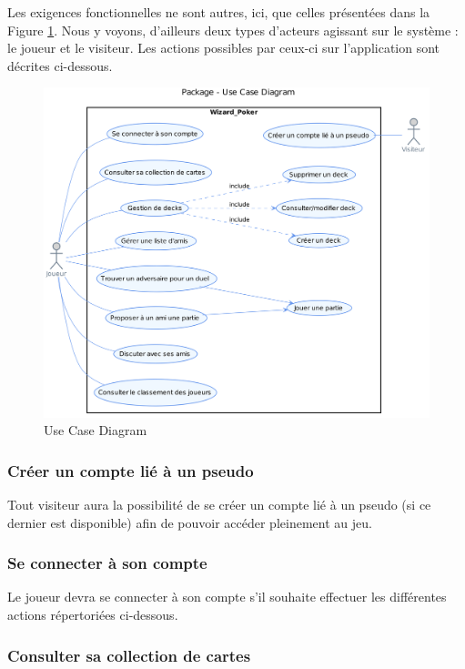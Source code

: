\documentclass[11pt,a4paper]{article}
\begin{document}
Les exigences fonctionnelles ne sont autres, ici, que celles présentées dans la Figure \ref{fig:usecasebesoin}. Nous y voyons, d'ailleurs deux types d'acteurs agissant sur le système : le joueur et le \gls{visiteur}. Les actions possibles par ceux-ci sur l'application sont décrites ci-dessous.

\label{sec:exi-fonc}
\begin{figure}[ht]
  \centering
  \includegraphics[width=1\textwidth]{../uml_files/UseCaseDiagram.png}
  \caption{\label{fig:usecasebesoin} Use Case Diagram}
\end{figure}

\subsubsection*{Créer un compte lié à un pseudo}

Tout visiteur aura la possibilité de se créer un compte
lié à un \gls{pseudo} (si ce dernier est disponible) afin de pouvoir
accéder pleinement au jeu.


\subsubsection*{Se connecter à son compte}

Le joueur devra se connecter à son compte s'il souhaite effectuer
les différentes actions répertoriées ci-dessous.


\subsubsection*{Consulter sa collection de cartes}
\end{document}
